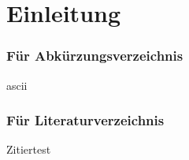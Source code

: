 \chapter{Einleitung}						%
	\label{Einleitung}



\subsection{Für Abkürzungsverzeichnis}

\acrfull{ascii}

\subsection{Für Literaturverzeichnis}

Zitiertest \cite[S.50]{bussysteme.2017}
